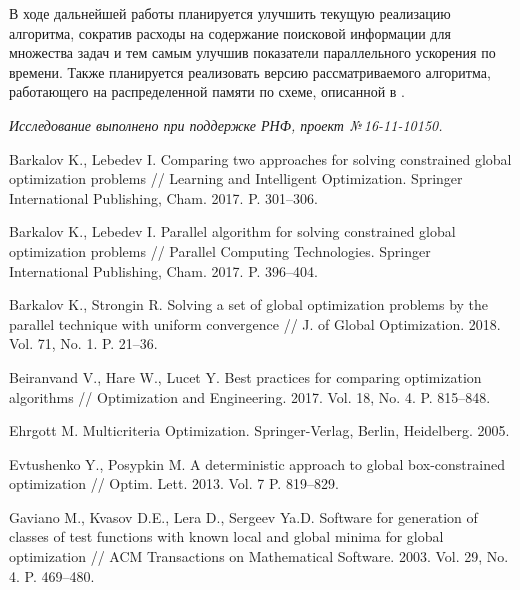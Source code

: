 \documentclass{cmi}
\begin{document}
В ходе дальнейшей работы планируется улучшить текущую реализацию алгоритма,
сократив расходы на содержание поисковой информации для множества задач и тем самым улучшив
показатели параллельного ускорения по времени. Также планируется реализовать версию
рассматриваемого алгоритма, работающего на распределенной памяти по схеме, описанной в \cite{BarkalovLebedev2017_2}.

\vspace{1em}
{\it Исследование выполнено при поддержке РНФ, проект №\,16-11-10150.}

\begin{biblio}
  Barkalov K., Lebedev I.
  \newblock Comparing two approaches for solving constrained global optimization
    problems
  \newblock // Learning and Intelligent Optimization. Springer International
    Publishing, Cham. 2017. P. 301--306.
  \newblock {}

  Barkalov K., Lebedev I.
  \newblock Parallel algorithm for solving constrained global optimization
    problems
  \newblock // Parallel Computing Technologies. Springer International
    Publishing, Cham. 2017. P. 396--404.
  \newblock {}

  Barkalov K., Strongin R.
  \newblock Solving a set of global optimization problems by the parallel
    technique with uniform convergence //
  \newblock J. of Global Optimization. 2018. Vol. 71, No. 1. P. 21--36.
  \newblock {}

  Beiranvand V., Hare W., Lucet Y.
  \newblock Best practices for comparing optimization algorithms //
  \newblock Optimization and Engineering. 2017. Vol. 18, No. 4. P. 815--848.
  \newblock {}

  Ehrgott M.
  \newblock Multicriteria Optimization.
  \newblock Springer-Verlag, Berlin, Heidelberg. 2005.
  \newblock {}

  Evtushenko Y., Posypkin M.
  \newblock A deterministic approach to global box-constrained optimization //
  \newblock Optim. Lett. 2013. Vol. 7 P. 819--829.
  \newblock {}

  {Gaviano M., Kvasov D.E., Lera D., Sergeev Ya.D.}
  \newblock Software for generation of classes of test functions with known local
    and global minima for global optimization //
  \newblock ACM Transactions on Mathematical Software. 2003. Vol. 29, No. 4. P.
    469--480.
  \newblock {}


\end{biblio}
\end{document}
